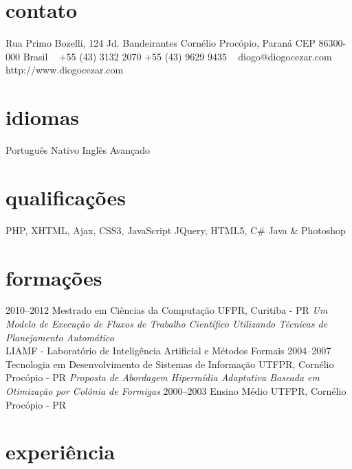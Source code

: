 \documentclass[]{friggeri-cv}
\begin{document}
	\onehalfspacing


	\begin{aside}
	\section{contato}
	Rua Primo Bozelli, 124
	Jd. Bandeirantes
	Cornélio Procópio, Paraná
	CEP 86300-000
	Brasil
	~
	+55 (43) 3132 2070
	+55 (43) 9629 9435
	~
	diogo@diogocezar.com
	http://www.diogocezar.com
	\section{idiomas}
	Português Nativo
	Inglês Avançado
	\section{qualificações}
	PHP, XHTML, Ajax,
	CSS3, JavaScript
	JQuery, HTML5, C\#
	Java \& Photoshop
	\end{aside}

	\section{formações}

	\begin{entrylist}
		\entry
		{2010--2012}
		{Mestrado {\normalfont em Ciências da Computação}}
		{UFPR, Curitiba - PR}
		{\emph{Um Modelo de Execução de Fluxos de Trabalho Científico Utilizando Técnicas de Planejamento Automático} \\ LIAMF - Laboratório de Inteligência Artificial e Métodos Formais}
		\entry
		{2004--2007}
		{Tecnologia {\normalfont  em Desenvolvimento de Sistemas de Informação}}
		{UTFPR, Cornélio Procópio - PR}
		{\emph{Proposta de Abordagem Hipermídia Adaptativa Baseada em Otimização por Colônia de Formigas}}
		\entry
		{2000--2003}
		{Ensino Médio}
		{UTFPR, Cornélio Procópio - PR}
		{}
	\end{entrylist}
	
\section{experiência}
\end{document}
